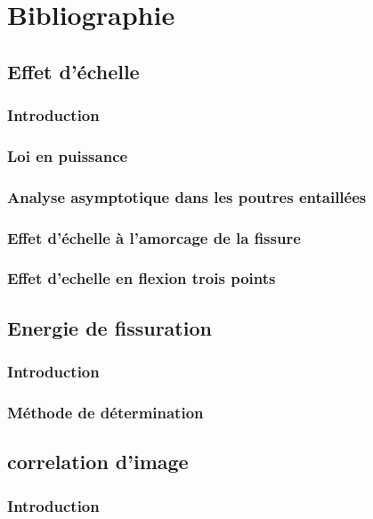 \documentclass[12pt]{report}
\begin{document}
\part{Bibliographie}
\chapter{Effet d'échelle}
\section{Introduction}


\section{Loi en puissance}


\section{Analyse asymptotique dans les poutres entaillées}


\section{Effet d'échelle à l'amorcage de la fissure}


\section{Effet d'echelle en flexion trois points}


\chapter{Energie de fissuration}
\section{Introduction}


\section{Méthode de détermination}



\chapter{correlation d'image}
\section{Introduction}
\end{document}
